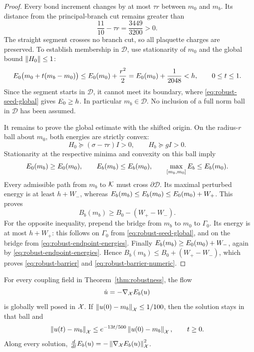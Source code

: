 \begin{proof}
Every bond increment changes by at most $\tau r$ between $m_0$ and
$m_b$. Its distance from the principal-branch cut remains greater than
\[
 \frac{11}{10}-\tau r=\frac{3449}{3200}>0.
\]
The straight segment crosses no branch cut, so all plaquette charges
are preserved. To establish membership in $\mathcal D$, use stationarity
of $m_0$ and the global bound $\left\lVert H_0\right\rVert\le1$:
\begin{equation}
 \label{eq:robust-low-bridge}
 E_0\big(m_0+t(m_b-m_0)\big)
 \le E_0(m_0)+\frac{r^2}{2}
 =E_0(m_0)+\frac1{2048}<h,
 \qquad 0\le t\le1.
\end{equation}
Since the segment starts in $\mathcal D$, it cannot meet its boundary,
where \eqref{eq:robust-seed-global} gives $E_0\ge h$. In particular
$m_b\in\mathcal D$. No inclusion of a full norm ball in $\mathcal D$
has been assumed.

It remains to prove the global estimate with the shifted origin. On
the radius-$r$ ball about $m_0$, both energies are strictly convex:
\[
 H_0\succeq(\sigma-\tau r)I>0,\qquad H_b\succeq gI>0.
\]
Stationarity at the respective minima and convexity on this ball imply
\begin{equation}
 \label{eq:robust-endpoint-energies}
 E_0(m_b)\ge E_0(m_0),\qquad E_b(m_b)\le E_b(m_0),\qquad
 \max_{[m_b,m_0]}E_b\le E_b(m_0).
\end{equation}
Every admissible path from $m_b$ to $\mathcal K$ must cross
$\partial\mathcal D$. Its maximal perturbed energy is at least
$h+W_-$, whereas
$E_b(m_b)\le E_b(m_0)\le E_0(m_0)+W_+$. This proves
\[
 B_b(m_b)\ge B_0-(W_+-W_-).
\]
For the opposite inequality, prepend the bridge from $m_b$ to $m_0$
to $\Gamma_0$. Its energy is at most $h+W_+$: this follows on
$\Gamma_0$ from \eqref{eq:robust-seed-global}, and on the bridge
from \eqref{eq:robust-endpoint-energies}. Finally
$E_b(m_b)\ge E_0(m_0)+W_-$, again by
\eqref{eq:robust-endpoint-energies}. Hence
$B_b(m_b)\le B_0+(W_+-W_-)$, which proves
\eqref{eq:robust-barrier} and \eqref{eq:robust-barrier-numeric}.
\end{proof}

\begin{corollary}
\label{cor:flow}
For every coupling field in Theorem~\ref{thm:robustness}, the flow
\begin{equation}
 \label{eq:robust-gradient-flow}
 \dot u=-\nabla_{\mathcal X}E_b(u)
\end{equation}
is globally well posed in $\mathcal X$. If $\left\lVert u(0)-m_b\right\rVert_{\mathcal X}\le1/100$, then
the solution stays in that ball and
\begin{equation}
 \label{eq:robust-exponential-stability}
 \left\lVert u(t)-m_b\right\rVert_{\mathcal X}
 \le e^{-13t/500}\left\lVert u(0)-m_b\right\rVert_{\mathcal X},\qquad t\ge0.
\end{equation}
Along every solution,
$\frac{d}{dt}E_b(u)=-\left\lVert\nabla_{\mathcal X}E_b(u)\right\rVert_{\mathcal X}^2$.
\end{corollary}

